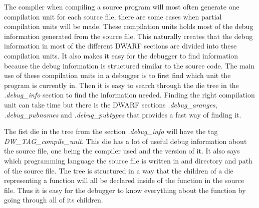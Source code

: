  


The compiler when compiling a source program will most often generate one compilation unit for each source file, there are some cases when partial compilation units will be made.
These compilation units holds most of the debug information generated from the source file.
This naturally creates that the debug information in most  of the different \gls{DWARF} sections are divided into these compilation units.
It also makes it easy for the debugger to find information because the debug information is structured similar to the source code.
The main use of these compilation units in a debugger is to first find which unit the program is currently in.
Then it is easy to search through the \gls{die} \gls{tree} in the \emph{.debug\_info} section to find the information needed. 
Finding the right compilation unit can take time but there is the \gls{DWARF} sections \emph{.debug\_aranges}, \emph{.debug\_pubnames} and \emph{.debug\_pubtypes} that provides a fast way of finding it.

The fist \gls{die} in the \gls{tree} from the section \emph{.debug\_info} will have the tag \emph{DW\_TAG\_compile\_unit}.
This \gls{die} has a lot of useful debug information about the source file, one being the compiler used and the version of it.
It also says which programming language the source file is written in and directory and path of the source file.
The \gls{tree} is structured in a way that the children of a \gls{die} representing a function will all be declared inside of the function in the source file.
Thus it is easy for the debugger to know everything about the function by going through all of its children.

